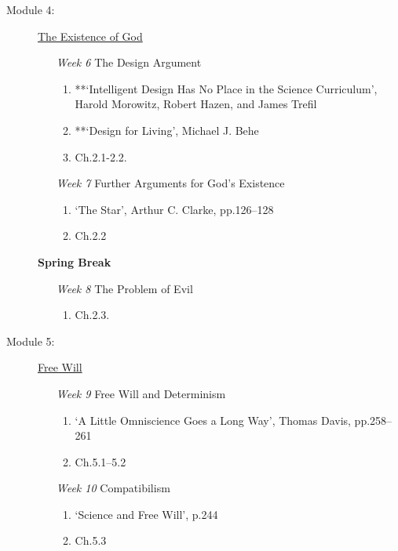 \documentclass[article,oneside]{memoir}
\begin{document}
\begin{description}
\item[Module 4: ] \href{http://scoconno.github.io/Teaching/Examined/God/}{The Existence of God}

\begin{enumerate}

\item[\textit{Week 6}] The Design Argument
\begin{enumerate}
\item **`Intelligent Design Has No Place in the Science Curriculum', Harold Morowitz, Robert Hazen, and James Trefil
 \item **`Design for Living', Michael J. Behe
\item Ch.2.1-2.2. 

 \end{enumerate}
 
\item[\textit{Week 7}] Further Arguments for God's Existence
\begin{enumerate}
\item `The Star', Arthur C. Clarke, pp.126--128
\item Ch.2.2
\end{enumerate}
\end{enumerate}
\item[ ] \textbf{Spring Break}

\begin{enumerate}
\item[\textit{Week 8}] The Problem of Evil 
\begin{enumerate}
\item Ch.2.3.
\end{enumerate}
\end{enumerate}


\item[Module 5:] \href{http://scoconno.github.io/Teaching/Examined/FreeWill/}{Free Will}

\begin{enumerate}

\item[\textit{Week 9}] Free Will and Determinism
\begin{enumerate}
\item `A Little Omniscience Goes a Long Way', Thomas Davis, pp.258--261
\item Ch.5.1--5.2
\end{enumerate}

\item[\textit{Week 10}] Compatibilism
\begin{enumerate}
\item `Science and Free Will', p.244
\item Ch.5.3
\end{enumerate}
\end{enumerate}


\end{description}
\end{document}
